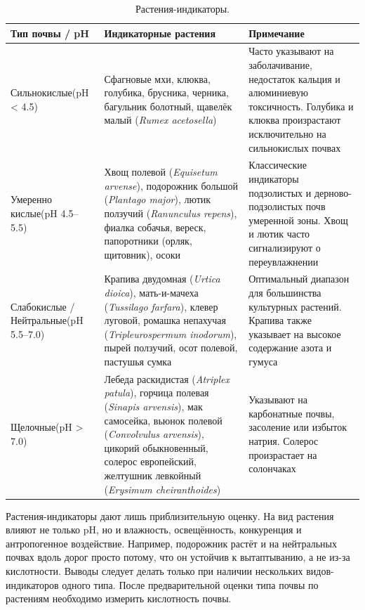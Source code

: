 \begin{table}[htbp]
    \small
    \caption{Растения-индикаторы.}
    \label{tab:indicator_plants}
    \begin{tabularx}{\textwidth}{
        >{\hsize}Y
        >{\hsize}Y
        >{\hsize}Y
        }
        \hline
        Тип почвы / pH & Индикаторные растения & Примечание \\
        \hline
        Сильнокислые\newline (pH < \num{4,5}) & Сфагновые мхи, клюква, голубика, брусника, черника, багульник болотный, щавелёк малый (\emph{Rumex acetosella}) & Часто указывают на заболачивание, недостаток кальция и алюминиевую токсичность. Голубика и клюква произрастают исключительно на сильнокислых почвах \\
        \hline
        Умеренно кислые\newline (pH \num{4,5}--\num{5,5}) & Хвощ полевой (\emph{Equisetum arvense}), подорожник большой (\emph{Plantago major}), лютик ползучий (\emph{Ranunculus repens}), фиалка собачья, вереск, папоротники (орляк, щитовник), осоки & Классические индикаторы подзолистых и дерново-подзолистых почв умеренной зоны. Хвощ и лютик часто сигнализируют о переувлажнении \\
        \hline
        Слабокислые /\newline Нейтральные\newline (pH \num{5,5}--\num{7,0}) & Крапива двудомная (\emph{Urtica dioica}), мать-и-мачеха (\emph{Tussilago farfara}), клевер луговой, ромашка непахучая (\emph{Tripleurospermum inodorum}), пырей ползучий, осот полевой, пастушья сумка & Оптимальный диапазон для большинства культурных растений. Крапива также указывает на высокое содержание азота и гумуса \\
        \hline
        Щелочные\newline (pH > \num{7,0}) & Лебеда раскидистая (\emph{Atriplex patula}), горчица полевая (\emph{Sinapis arvensis}), мак самосейка, вьюнок полевой (\emph{Convolvulus arvensis}), цикорий обыкновенный, солерос европейский, желтушник левкойный (\emph{Erysimum cheiranthoides}) & Указывают на карбонатные почвы, засоление или избыток натрия. Солерос произрастает на солончаках \\
        \hline
    \end{tabularx}
\end{table}

Растения-индикаторы дают лишь приблизительную оценку. На вид растения влияют не только pH, но и влажность, освещённость, конкуренция и антропогенное воздействие. Например, подорожник растёт и на нейтральных почвах вдоль дорог просто потому, что он устойчив к вытаптыванию, а не из-за кислотности. Выводы следует делать только при наличии нескольких видов-индикаторов одного типа. После предварительной оценки типа почвы по растениям необходимо измерить кислотность почвы.

